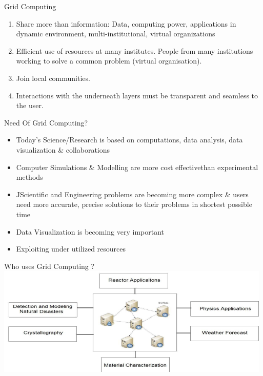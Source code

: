 \documentclass{SKP-beamer}
\begin{document}
\begin{frame}{Grid Computing}
	\begin{enumerate}
		
		\item  Share more than information: Data, computing power, applications in 
		dynamic environment, multi-institutional, virtual organizations \\
		\item  Efficient use of resources at many institutes. People from many institutions
		working to solve a common problem (virtual organisation). \\
		\item  Join local communities. \\
		\item  Interactions with the underneath layers must be transparent and seamless 
		to the user.
		
	\end{enumerate}
\end{frame}


\begin{frame}{ Need Of Grid Computing?}
	\begin{itemize}
		
		\item   Today’s Science/Research is based on computations, data analysis, data 
		visualization \& collaborations
		\item Computer Simulations \& Modelling are more cost effectivethan
		experimental methods
		\item  JScientific and Engineering problems are becoming more complex \& users 
		need more accurate, precise solutions to their problems in shortest possible 
		time
		\item  Data Visualization is becoming very important
		\item Exploiting under utilized resources
		
	\end{itemize}
\end{frame}



\begin{frame}{Who uses Grid Computing ?}
	\includegraphics[scale=1.0]{5.png}
\end{frame}
\end{document}
